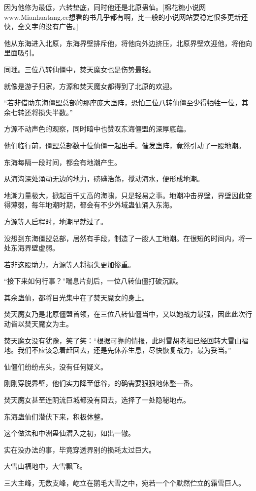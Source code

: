 \begin{this_body}
因为他修为最低，六转垫底，同时他还是北原蛊仙。[棉花糖小说网www.Mianhuatang.cc想看的书几乎都有啊，比一般的小说网站要稳定很多更新还快，全文字的没有广告。]

他从东海进入北原，东海界壁排斥他，将他向外边挤压，北原界壁欢迎他，将他向里面吸引。

同理。三位八转仙僵中，焚天魔女也是伤势最轻。

就像是游子归家，方源和焚天魔女都得到了北原的欢迎。

“若非借助东海僵盟总部的那座庞大蛊阵，恐怕三位八转仙僵至少得牺牲一位，其余七转还将损失半数。”

方源不动声色的观察，同时暗中也赞叹东海僵盟的深厚底蕴。

他们临行前，僵盟总部数十位仙僵一起出手。催发蛊阵，竟然引动了一股地潮。

东海每隔一段时间，都会有地潮产生。

从海沟深处涌动无边的地力，磅礴浩荡，搅动海水，便形成地潮。

地潮力量极大，掀起百千丈高的海啸，只是轻易之事。地潮冲击界壁，界壁因此变得薄弱，每年地潮时期，都会有不少外域蛊仙涌入东海。

方源等人启程时，地潮早就过了。

没想到东海僵盟总部，居然有手段，制造了一股人工地潮。在很短的时间内，将一处东海界壁虚弱。

若非这股助力，方源等人将损失更加惨重。

“接下来如何行事？”喘息片刻后，一位八转仙僵打破沉默。

其余蛊仙，都将目光集中在了焚天魔女的身上。

焚天魔女乃是北原僵盟首领，在三位八转仙僵当中，又以她战力最强，因此此次行动皆以焚天魔女为主。

焚天魔女没有犹豫，笑了笑：“根据可靠的情报，此时雪胡老祖已经回转大雪山福地。我们不应该急着赶回去，还是先休养生息，尽快恢复战力，最为妥当。”

仙僵们纷纷点头，没有任何疑义。

刚刚穿脱界壁，他们实力降至低谷，的确需要狠狠地休整一番。

焚天魔女甚至连阴流巨城都没有回去，选择了一处隐秘地点。

东海蛊仙们潜伏下来，积极休整。

这个做法和中洲蛊仙潜入之初，如出一辙。

实在没办法的事，毕竟穿透界别的损耗太过巨大。

大雪山福地中，大雪飘飞。

三大主峰，无数支峰，屹立在鹅毛大雪之中，宛若一个个默然伫立的霜雪巨人。


\end{this_body}

